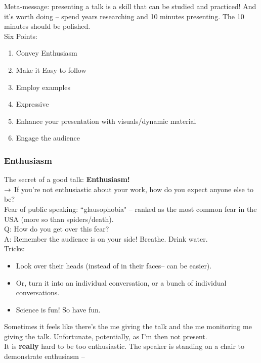 Meta-message: presenting a talk is a skill that can be studied and practiced! And it's worth doing -- spend years researching and 10 minutes presenting. The 10 minutes should be polished. \\

Six Points:
\begin{enumerate}
    \item Convey Enthusiasm
    \item Make it Easy to follow
    \item Employ examples
    \item Expressive
    \item Enhance your presentation with visuals/dynamic material
    \item Engage the audience
\end{enumerate}


\subsubsection{Enthusiasm}
The secret of a good talk: {\bf Enthusiasm!}\\

$\rightarrow$ If you're not enthusiastic about your work, how do you expect anyone else to be? \\

Fear of public speaking: ``glausophobia" -- ranked as the most common fear in the USA (more so than spiders/death). \\

Q: How do you get over this fear? \\

A: Remember the audience is on your side! Breathe. Drink water. \\

Tricks:
\begin{itemize}
    \item Look over their heads (instead of in their faces-- can be easier).
    \item Or, turn it into an individual conversation, or a bunch of individual conversations.
    \item Science is fun! So have fun.
\end{itemize} 

Sometimes it feels like there's the me giving the talk and the me monitoring me giving the talk. Unfortunate, potentially, as I'm then not present.\\

It is {\bf really} hard to be too enthusiastic. The speaker is standing on a chair to demonstrate enthusiasm --\\


